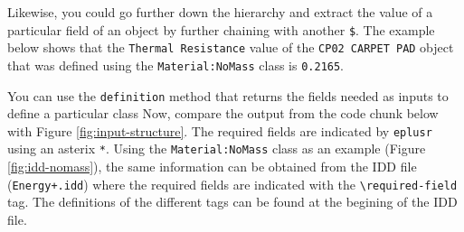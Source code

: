 \documentclass[
]{book}
\newenvironment{Shaded}{\begin{snugshade}}{\end{snugshade}}
\newcommand{\AttributeTok}[1]{\textcolor[rgb]{0.77,0.63,0.00}{#1}}
\newcommand{\DocumentationTok}[1]{\textcolor[rgb]{0.56,0.35,0.01}{\textbf{\textit{#1}}}}
\newcommand{\NormalTok}[1]{#1}
\newcommand{\SpecialCharTok}[1]{\textcolor[rgb]{0.00,0.00,0.00}{#1}}
\newcommand{\StringTok}[1]{\textcolor[rgb]{0.31,0.60,0.02}{#1}}
\begin{document}
Likewise, you could go further down the hierarchy and extract the value of a particular field of an object by further chaining with another \texttt{\$}. The example below shows that the \texttt{Thermal\ Resistance} value of the \texttt{CP02\ CARPET\ PAD} object that was defined using the \texttt{Material:NoMass} class is \texttt{0.2165}.

\begin{Shaded}
\end{Shaded}

You can use the \texttt{definition} method that returns the fields needed as inputs to define a particular class
Now, compare the output from the code chunk below with Figure \ref{fig:input-structure}. The required fields are indicated by \texttt{eplusr} using an asterix \texttt{*}. Using the \texttt{Material:NoMass} class as an example (Figure \ref{fig:idd-nomass}), the same information can be obtained from the IDD file (\texttt{Energy+.idd}) where the required fields are indicated with the \texttt{\textbackslash{}required-field} tag. The definitions of the different tags can be found at the begining of the IDD file.
\end{document}
